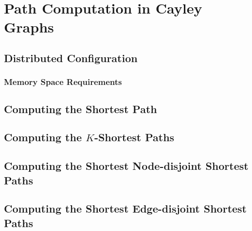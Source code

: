 
\chapter{Path Computation in Cayley Graphs}
\label{ch:path_comp_in_cg} %



\ifpdf
    \graphicspath{{4_path_comp_in_cg/figures/PNG/}{4_path_comp_in_cg/figures/PDF/}{4_path_comp_in_cg/figures/}}
\else
    \graphicspath{{4_path_comp_in_cg/figures/EPS/}{4_path_comp_in_cg/figures/}}
\fi


\section{Distributed Configuration}

\subsection{Memory Space Requirements}

\section{Computing the Shortest Path}

\section{Computing the $K$-Shortest Paths}

\section{Computing the Shortest Node-disjoint Shortest Paths}

\section{Computing the Shortest Edge-disjoint Shortest Paths}


